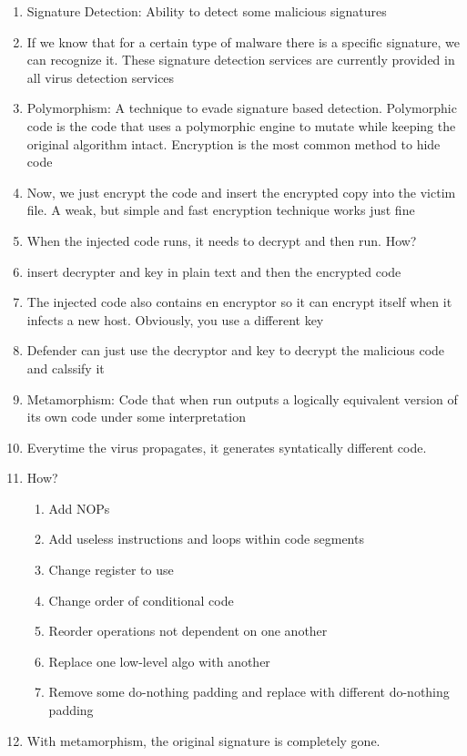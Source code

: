 \documentclass[a4paper, 11pt, oneside]{researchjournal} %
\begin{document}
\begin{enumerate}
     \item Signature Detection: Ability to detect some malicious signatures
     \item If we know that for a certain type of malware there is a specific signature, we can recognize it. These signature detection services are currently provided in all virus detection services
     \item Polymorphism: A technique to evade signature based detection. Polymorphic code is the code that uses a polymorphic engine to mutate while keeping the original algorithm intact. Encryption is the most common method to hide code
     \item Now, we just encrypt the code and insert the encrypted copy into the victim file. A weak, but simple and fast encryption technique works just fine
     \item When the injected code runs, it needs to decrypt and then run. How?
     \item insert decrypter and key in plain text and then the encrypted code
     \item The injected code also contains en encryptor so it can encrypt itself when it infects a new host. Obviously, you use a different key
     \item Defender can just use the decryptor and key to decrypt the malicious code and calssify it
     \item Metamorphism: Code that when run outputs a logically equivalent version of its own code under some interpretation
     \item Everytime the virus propagates, it generates syntatically different code. 
     \item How?
     \begin{enumerate}
         \item Add NOPs
         \item Add useless instructions and loops within code segments
         \item Change register to use 
         \item Change order of conditional code 
         \item Reorder operations not dependent on one another
         \item Replace one low-level algo with another
         \item Remove some do-nothing padding and replace with different do-nothing padding
     \end{enumerate}
     \item With metamorphism, the original signature is completely gone. 

\end{enumerate}
\end{document}
